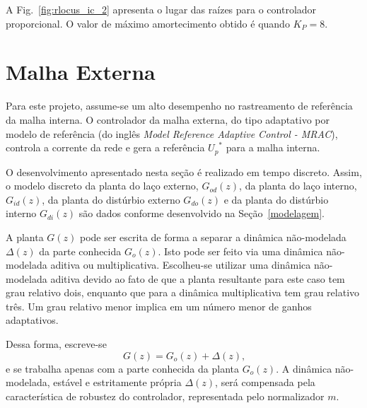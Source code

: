   A Fig.~\ref{fig:rlocus_ic_2} apresenta o lugar das raízes para o controlador proporcional. O valor de máximo amortecimento obtido é quando $K_P = 8$.


\section{Malha Externa}

  Para este projeto, assume-se um alto desempenho no rastreamento de referência da malha interna. O controlador da malha externa, do tipo adaptativo por modelo de referência (do inglês \emph{Model Reference Adaptive Control - MRAC}), controla a corrente da rede e gera a referência ${U_p}^*$ para a malha interna.

  O desenvolvimento apresentado nesta seção é realizado em tempo discreto. Assim, o modelo discreto da planta do laço externo, $G_{od}(z)$, da planta do laço interno, $G_{id}(z)$, da planta do distúrbio externo $G_{do}(z)$ e da planta do distúrbio interno $G_{di}(z)$ são dados conforme desenvolvido na Seção~\ref{modelagem}.

  A planta $G(z)$ pode ser escrita de forma a separar a dinâmica não-modelada $\Delta(z)$ da parte conhecida $G_o(z)$. Isto pode ser feito via uma dinâmica não-modelada aditiva ou multiplicativa. Escolheu-se utilizar uma dinâmica não-modelada aditiva devido ao fato de que a planta resultante para este caso tem grau relativo dois, enquanto que para a dinâmica multiplicativa tem grau relativo três. Um grau relativo menor implica em um número menor de ganhos adaptativos.

  Dessa forma, escreve-se
  \begin{equation}
    G(z) = G_o(z) + \Delta(z) \text{,}
    \label{eq:planta_go_delta_aditiva}
  \end{equation}
  e se trabalha apenas com a parte conhecida da planta $G_o(z)$. A dinâmica não-modelada, estável e estritamente própria $\Delta(z)$, será compensada pela característica de robustez do controlador, representada pelo normalizador $m$.

